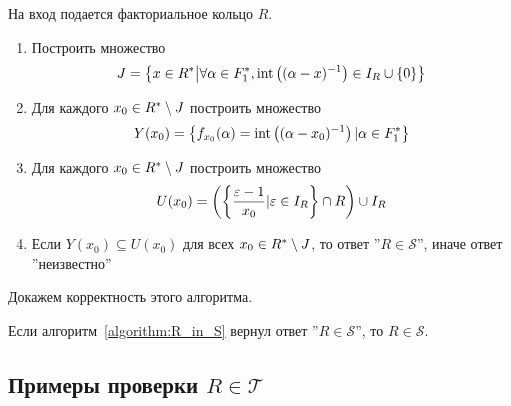 \documentclass[_00_autoref.tex]{subfiles}
\begin{document}
\begin{algorithm}\label{algorithm:R_in_S}
    На вход подается факториальное кольцо $R$.
    
    \begin{enumerate}
        \item Построить множество
        \begin{equation*}
            J = \left\{
                x \in R^{*} \big| \forall \alpha \in F_1^{*}, \textrm{int}\left((\alpha - x)^{-1}\right) \in I_{R} \cup \{0\}
            \right\}
        \end{equation*}
        
        \item Для каждого $x_0 \in R^{*} \setminus J$ построить множество
        \begin{equation*}
            Y(x_0) = \left\{
                f_{x_0}(\alpha) = \textrm{int}\left((\alpha - x_0)^{-1}\right) | \alpha \in F_1^{*}
            \right\}
        \end{equation*}
        
        \item Для каждого $x_0 \in R^{*} \setminus J$ построить множество
        \begin{equation*}
            U(x_0) = \left(
                \left\{
                    \frac{\varepsilon - 1}{x_0} | \varepsilon \in I_{R}
                \right\} \cap R
            \right) \cup I_{R}
        \end{equation*}
        
        \item Если $Y(x_0) \subseteq U(x_0)$ для всех $x_0 \in R^{*} \setminus J$, то ответ ''$R \in \mathcal{S}$'', иначе ответ ''неизвестно''
    \end{enumerate}
\end{algorithm}

Докажем корректность этого алгоритма.

\begin{lemma}
    Если алгоритм~\ref{algorithm:R_in_S} вернул ответ ''$R \in \mathcal{S}$'', то $R \in \mathcal{S}$.
\end{lemma}

\subsection{Примеры проверки $R \in \mathcal{T}$}
\end{document}
